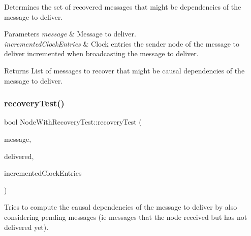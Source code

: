 Determines the set of recovered messages that might be dependencies of the message to deliver. 


\begin{DoxyParams}{Parameters}
{\em message} & Message to deliver. \\
\hline
{\em incremented\+Clock\+Entries} & Clock entries the sender node of the message to deliver incremented when broadcasting the message to deliver. \\
\hline
\end{DoxyParams}
\begin{DoxyReturn}{Returns}
List of messages to recover that might be causal dependencies of the message to deliver. 
\end{DoxyReturn}
\mbox{\label{class_node_with_recovery_test_a8e4f79eeb8c415ceca21b82f22eb9038}} 
\subsubsection{\texorpdfstring{recovery\+Test()}{recoveryTest()}}
{\footnotesize\ttfamily bool Node\+With\+Recovery\+Test\+::recovery\+Test (\begin{DoxyParamCaption}\item[{const \hyperlink{structures_8h_a7e7bdc1d2fff8a9436f2f352b2711ed6}{message\+Info} \&}]{message,  }\item[{const vector$<$ \hyperlink{structures_8h_a7e7bdc1d2fff8a9436f2f352b2711ed6}{message\+Info} $>$ \&}]{delivered,  }\item[{const vector$<$ unsigned int $>$ \&}]{incremented\+Clock\+Entries }\end{DoxyParamCaption})\hspace{0.3cm}{\ttfamily [protected]}}



Tries to compute the causal dependencies of the message to deliver by also considering pending messages (ie messages that the node received but has not delivered yet). 


